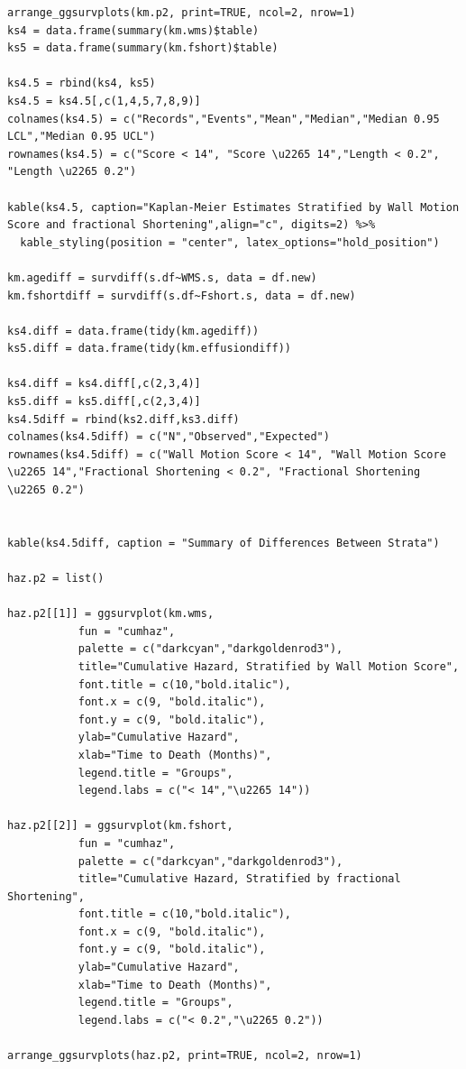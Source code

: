 \documentclass[
]{article}
\begin{document}
\begin{verbatim}
arrange_ggsurvplots(km.p2, print=TRUE, ncol=2, nrow=1)
ks4 = data.frame(summary(km.wms)$table)
ks5 = data.frame(summary(km.fshort)$table)

ks4.5 = rbind(ks4, ks5)
ks4.5 = ks4.5[,c(1,4,5,7,8,9)]
colnames(ks4.5) = c("Records","Events","Mean","Median","Median 0.95 LCL","Median 0.95 UCL")
rownames(ks4.5) = c("Score < 14", "Score \u2265 14","Length < 0.2", "Length \u2265 0.2")

kable(ks4.5, caption="Kaplan-Meier Estimates Stratified by Wall Motion Score and fractional Shortening",align="c", digits=2) %>%
  kable_styling(position = "center", latex_options="hold_position")

km.agediff = survdiff(s.df~WMS.s, data = df.new)
km.fshortdiff = survdiff(s.df~Fshort.s, data = df.new)

ks4.diff = data.frame(tidy(km.agediff))
ks5.diff = data.frame(tidy(km.effusiondiff))

ks4.diff = ks4.diff[,c(2,3,4)]
ks5.diff = ks5.diff[,c(2,3,4)]
ks4.5diff = rbind(ks2.diff,ks3.diff)
colnames(ks4.5diff) = c("N","Observed","Expected")
rownames(ks4.5diff) = c("Wall Motion Score < 14", "Wall Motion Score \u2265 14","Fractional Shortening < 0.2", "Fractional Shortening \u2265 0.2")


kable(ks4.5diff, caption = "Summary of Differences Between Strata")

haz.p2 = list()

haz.p2[[1]] = ggsurvplot(km.wms, 
           fun = "cumhaz",
           palette = c("darkcyan","darkgoldenrod3"), 
           title="Cumulative Hazard, Stratified by Wall Motion Score",
           font.title = c(10,"bold.italic"),
           font.x = c(9, "bold.italic"),
           font.y = c(9, "bold.italic"),
           ylab="Cumulative Hazard", 
           xlab="Time to Death (Months)",
           legend.title = "Groups",
           legend.labs = c("< 14","\u2265 14"))

haz.p2[[2]] = ggsurvplot(km.fshort,
           fun = "cumhaz",
           palette = c("darkcyan","darkgoldenrod3"), 
           title="Cumulative Hazard, Stratified by fractional Shortening",
           font.title = c(10,"bold.italic"),
           font.x = c(9, "bold.italic"),
           font.y = c(9, "bold.italic"),
           ylab="Cumulative Hazard", 
           xlab="Time to Death (Months)",
           legend.title = "Groups",
           legend.labs = c("< 0.2","\u2265 0.2"))

arrange_ggsurvplots(haz.p2, print=TRUE, ncol=2, nrow=1)



\end{verbatim}
\end{document}

